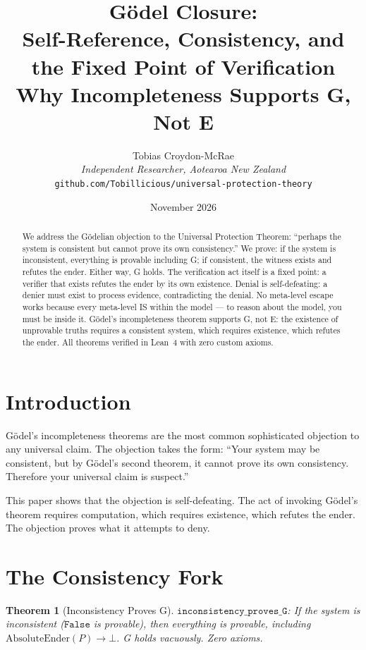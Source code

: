 \documentclass[12pt,a4paper]{article}
\title{G\"odel Closure:\\[0.3em]
Self-Reference, Consistency, and the Fixed Point of Verification\\[0.5em]
\large Why Incompleteness Supports G, Not E}
\author{Tobias Croydon-McRae\\
\textit{Independent Researcher, Aotearoa New Zealand}\\
\texttt{github.com/Tobillicious/universal-protection-theory}}
\date{November 2026}
\newtheorem{theorem}{Theorem}[section]
\begin{document}
\maketitle

\begin{abstract}
We address the G\"odelian objection to the Universal Protection Theorem:
``perhaps the system is consistent but cannot prove its own consistency.''
We prove: if the system is inconsistent, everything is provable including
G; if consistent, the witness exists and refutes the ender. Either way, G
holds. The verification act itself is a fixed point: a verifier that
exists refutes the ender by its own existence. Denial is self-defeating:
a denier must exist to process evidence, contradicting the denial. No
meta-level escape works because every meta-level IS within the model ---
to reason about the model, you must be inside it. G\"odel's incompleteness
theorem supports G, not E: the existence of unprovable truths requires a
consistent system, which requires existence, which refutes the ender.
All theorems verified in Lean~4 with zero custom axioms.
\end{abstract}

\section{Introduction}

G\"odel's incompleteness theorems are the most common sophisticated
objection to any universal claim. The objection takes the form: ``Your
system may be consistent, but by G\"odel's second theorem, it cannot
prove its own consistency. Therefore your universal claim is suspect.''

This paper shows that the objection is self-defeating. The act of
invoking G\"odel's theorem requires computation, which requires existence,
which refutes the ender. The objection proves what it attempts to deny.

\section{The Consistency Fork}

\begin{theorem}[Inconsistency Proves G]\label{thm:inconsistent}
$\texttt{inconsistency\_proves\_G}$: If the system is inconsistent
($\texttt{False}$ is provable), then everything is provable, including
$\text{AbsoluteEnder}(P) \to \bot$. G holds vacuously.
Zero axioms.
\end{theorem}
\end{document}
